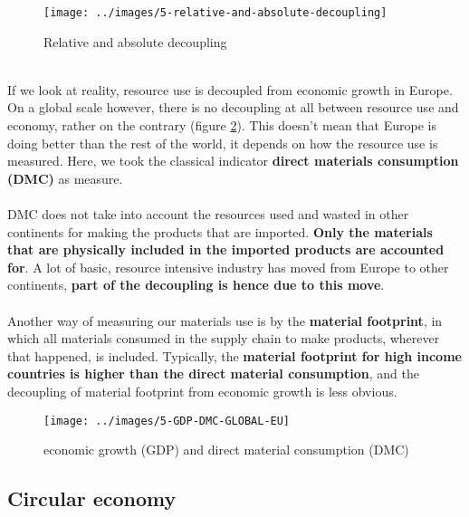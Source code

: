 \documentclass[../summary.tex]{subfiles}
\begin{document}
\begin{figure}[H]
	\centering
	\texttt{[image: ../images/5-relative-and-absolute-decoupling]}
	\caption{Relative and absolute decoupling}
	\label{fig:relative-and-absolute-decoupling}
\end{figure}

\ \\
If we look at reality, resource use is decoupled from economic growth in Europe. On a global scale however, there is no decoupling at all between resource use and economy, rather on the contrary (figure \ref{fig:gdp-dmc-global-eu}). This doesn't mean that Europe is doing better than the rest of the world, it depends on how the resource use is measured. Here, we took the classical indicator \textbf{direct materials consumption (DMC)} as measure.
\\\\
DMC does not take into account the resources used and wasted in other continents for making the products that are imported. \textbf{Only the materials that are physically included in the imported products are accounted for}. A lot of basic, resource intensive industry has moved from Europe to other continents, \textbf{part of the decoupling is hence due to this move}.
\\\\
Another way of measuring our materials use is by the \textbf{material footprint}, in which all materials consumed in the supply chain to make products, wherever that happened, is included. Typically, the \textbf{material footprint for high income countries is higher than the direct material consumption}, and the decoupling of material footprint from economic growth is less obvious.

\begin{figure}[H]
	\centering
	\texttt{[image: ../images/5-GDP-DMC-GLOBAL-EU]}
	\caption{economic growth (GDP) and direct material consumption (DMC)}
	\label{fig:gdp-dmc-global-eu}
\end{figure}

\newpage
\subsection{Circular economy}
\end{document}
